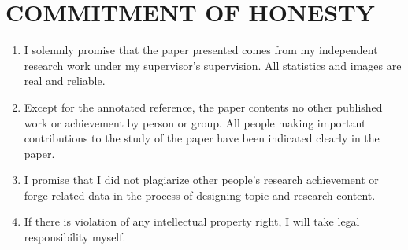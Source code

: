 \chapter*{COMMITMENT OF HONESTY}
\label{chap:honest}

\begin{enumerate}
\item I solemnly promise that the paper presented comes from my independent research work under my supervisor's supervision. All statistics and images are real and reliable.
\item Except for the annotated reference, the paper contents no other published work or achievement by person or group. All people making important contributions to the study of the paper have been indicated clearly in the paper.
\item I promise that I did not plagiarize other people's research achievement or forge related data in the process of designing topic and research content.
\item If there is violation of any intellectual property right, I will take legal responsibility myself.
\end{enumerate}

\baselineskip


